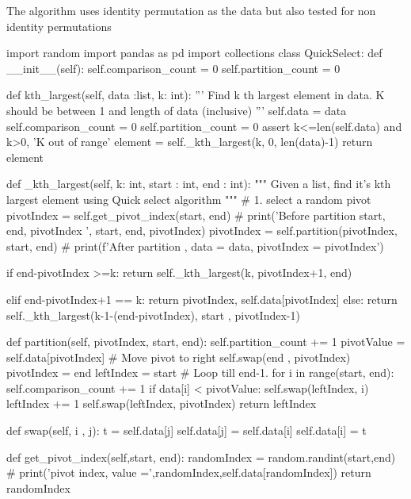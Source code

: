 \documentclass{homeworg}
\begin{document}
The algorithm uses identity permutation as the data but also tested for non identity permutations
\begin{python}

import random
import pandas as pd
import collections
class QuickSelect:
    def __init__(self):
        self.comparison_count = 0
        self.partition_count = 0

    def kth_largest(self, data :list, k: int):
        '''
        Find k th largest element in data. K should be between 1 and length of data (inclusive)
        '''
        self.data = data
        self.comparison_count = 0
        self.partition_count = 0
        assert k<=len(self.data) and k>0, 'K out of range'
        element =  self._kth_largest(k, 0, len(data)-1)
        return element
    
    def _kth_largest(self, k: int, start : int, end : int):
        """
        Given a list, find it's kth largest element using Quick select algorithm
        """
        # 1. select a random pivot
        pivotIndex = self.get_pivot_index(start, end)
        # print('Before partition start, end, pivotIndex ',  start, end, pivotIndex)
        pivotIndex = self.partition(pivotIndex, start, end)
        # print(f'After partition , data = {data}, pivotIndex = {pivotIndex}')

        if end-pivotIndex >=k:
            return self._kth_largest(k, pivotIndex+1, end)
            
        elif end-pivotIndex+1 == k:
            return pivotIndex, self.data[pivotIndex]
        else:
            return self._kth_largest(k-1-(end-pivotIndex), start , pivotIndex-1)

    def partition(self, pivotIndex, start, end):
        self.partition_count += 1
        pivotValue = self.data[pivotIndex]
        # Move pivot to right
        self.swap(end , pivotIndex)
        pivotIndex = end
        leftIndex = start
        # Loop till end-1.
        for i in range(start, end):
            self.comparison_count += 1
            if data[i] < pivotValue:
                self.swap(leftIndex, i)
                leftIndex += 1
        self.swap(leftIndex, pivotIndex)
        return leftIndex
    
    def swap(self, i , j):
        t = self.data[j]
        self.data[j] = self.data[i]
        self.data[i] = t

    def get_pivot_index(self,start, end):
        randomIndex = random.randint(start,end)
        # print('pivot index, value =',randomIndex,self.data[randomIndex])
        return randomIndex


\end{python}
\end{document}
